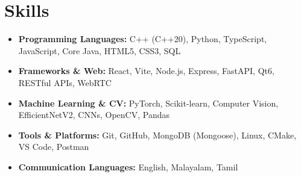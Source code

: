 \documentclass[10pt,a4paper]{article}
\begin{document}
\section*{Skills}
\begin{itemize}
    \item \textbf{Programming Languages:} C++ (C++20), Python, TypeScript, JavaScript, Core Java, HTML5, CSS3, SQL
    \item \textbf{Frameworks \& Web:} React, Vite, Node.js, Express, FastAPI, Qt6, RESTful APIs, WebRTC
    \item \textbf{Machine Learning \& CV:} PyTorch, Scikit-learn, Computer Vision, EfficientNetV2, CNNs, OpenCV, Pandas
    \item \textbf{Tools \& Platforms:} Git, GitHub, MongoDB (Mongoose), Linux, CMake, VS Code, Postman
    \item \textbf{Communication Languages:} English, Malayalam, Tamil
\end{itemize}
\end{document}
